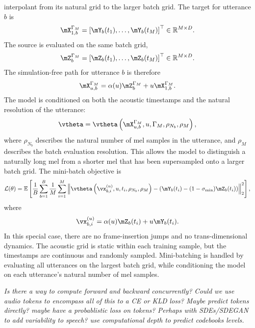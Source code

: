 interpolant from its natural grid to the larger batch grid. The target for utterance $b$ is \[ \mX_{1,b}^{\Gamma_M} = \left[ \mY_b(t_1),\dots,\mY_b(t_M) \right]^\top \in \mathbb{R}^{M \times D}. \] The source is evaluated on the same batch grid, \[ \mZ_b^{\Gamma_M} = \left[ \mZ_b(t_1),\dots,\mZ_b(t_M) \right]^\top \in \mathbb{R}^{M \times D}. \] The simulation-free path for utterance $b$ is therefore \[ \mX_{u,b}^{\Gamma_M} = \alpha(u)\mZ_b^{\Gamma_M} + u\mX_{1,b}^{\Gamma_M}. \] The model is conditioned on both the acoustic timestamps and the natural resolution of the utterance: \[ \vtheta = \vtheta \left( \mX_{u,b}^{\Gamma_M}, u, \Gamma_M, \rho_{N_b}, \rho_M \right), \] where $\rho_{N_b}$ describes the natural number of mel samples in the utterance, and $\rho_M$ describes the batch evaluation resolution. This allows the model to distinguish a naturally long mel from a shorter mel that has been supersampled onto a larger batch grid. The mini-batch objective is \[ \mathcal{L}(\theta) = \mathbb{E} \left[ \frac{1}{B} \sum_{b=1}^{B} \frac{1}{M} \sum_{i=1}^{M} \left\| \vtheta \left( \vx_{b,i}^{(u)}, u, t_i, \rho_{N_b}, \rho_M \right) - \left( \mY_b(t_i) - (1-\sigma_{\min})\mZ_b(t_i) \right) \right\|_2^2 \right], \] where \[ \vx_{b,i}^{(u)} = \alpha(u)\mZ_b(t_i) + u\mY_b(t_i). \] In this special case, there are no frame-insertion jumps and no trans-dimensional dynamics. The acoustic grid is static within each training sample, but the timestamps are continuous and randomly sampled. Mini-batching is handled by evaluating all utterances on the largest batch grid, while conditioning the model on each utterance's natural number of mel samples.





\clearpage
\textit{Is there a way to compute forward and backward concurrently? Could we use audio tokens to encompass all of this to a CE or KLD loss? Maybe predict tokens directly? maybe have a probablistic loss on tokens? Perhaps with SDEs/SDEGAN to add variability to speech? use computational depth to predict codebooks levels.}
